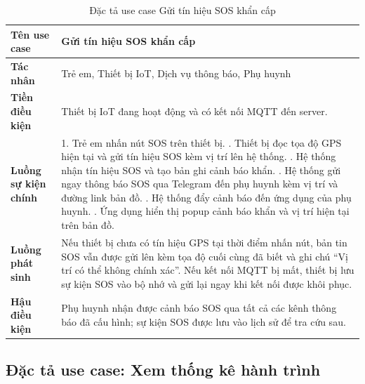 \documentclass[../DoAn.tex]{subfiles}
\begin{document}
\begin{table}[H]
\centering
\caption{Đặc tả use case Gửi tín hiệu SOS khẩn cấp}
\label{table:uc_sos}
\begin{tabular}{|l|p{9.5cm}|}
\hline
\textbf{Tên use case}       & Gửi tín hiệu SOS khẩn cấp \\
\hline
\textbf{Tác nhân}           & Trẻ em, Thiết bị IoT, Dịch vụ thông báo, Phụ huynh \\
\hline
\textbf{Tiền điều kiện}     & Thiết bị IoT đang hoạt động và có kết nối MQTT đến server. \\
\hline
\textbf{Luồng sự kiện chính} &
1. Trẻ em nhấn nút SOS trên thiết bị. \newline
2. Thiết bị đọc tọa độ GPS hiện tại và gửi tín hiệu SOS kèm vị trí lên hệ thống. \newline
3. Hệ thống nhận tín hiệu SOS và tạo bản ghi cảnh báo khẩn. \newline
4. Hệ thống gửi ngay thông báo SOS qua Telegram đến phụ huynh kèm vị trí và đường link bản đồ. \newline
5. Hệ thống đẩy cảnh báo đến ứng dụng của phụ huynh. \newline
6. Ứng dụng hiển thị popup cảnh báo khẩn và vị trí hiện tại trên bản đồ. \\
\hline
\textbf{Luồng phát sinh}    & Nếu thiết bị chưa có tín hiệu GPS tại thời điểm nhấn nút, bản tin SOS vẫn được gửi lên kèm tọa độ cuối cùng đã biết và ghi chú ``Vị trí có thể không chính xác''. Nếu kết nối MQTT bị mất, thiết bị lưu sự kiện SOS vào bộ nhớ và gửi lại ngay khi kết nối được khôi phục. \\
\hline
\textbf{Hậu điều kiện}      & Phụ huynh nhận được cảnh báo SOS qua tất cả các kênh thông báo đã cấu hình; sự kiện SOS được lưu vào lịch sử để tra cứu sau. \\
\hline
\end{tabular}
\end{table}

\subsection{Đặc tả use case: Xem thống kê hành trình}
\end{document}
